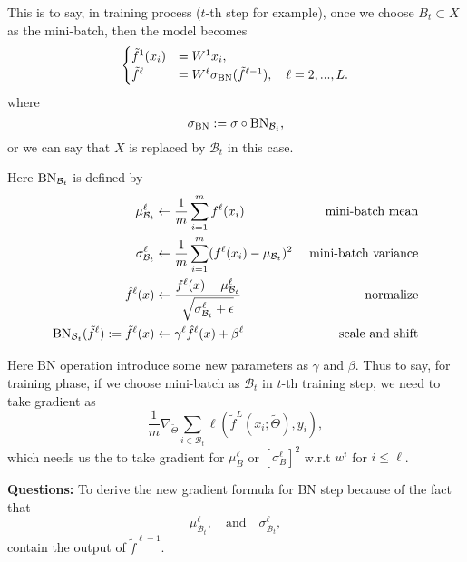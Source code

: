 This is to say, in training process ($t$-th step for example), once we choose $B_t \subset X$
as the mini-batch, then the model becomes
\begin{equation}\label{nn-BN-training}
\begin{cases}
\tilde f^1(x_i)&= W^1 x_i ,\\
\tilde f^\ell &= W^{\ell}  \sigma_{\rm BN}(\tilde f^{\ell-1}), \quad  \ell=2,...,L.
\end{cases}
\end{equation}
where
\begin{equation}
\sigma_{\rm BN} := \sigma \circ {\rm BN}_{\mathcal B_t},
\end{equation}
or we can say that $X$ is replaced by $\mathcal B_t$ in this case.

Here ${\rm BN}_{\mathcal B_t}$ is defined by
\begin{equation}\label{def:BNeq-traning}
\begin{aligned}
\mu^\ell_{\mathcal B_t} & \leftarrow \frac{1}{m}\sum_{i=1}^m f^\ell(x_i) & \text{ mini-batch mean}& \\
\sigma^\ell_{\mathcal B_t} & \leftarrow \frac{1}{m}\sum_{i=1}^m (f^\ell(x_i)-\mu_{\mathcal B_t})^2 &  \text{ mini-batch variance}&\\
\hat f^\ell (x) & \leftarrow \frac{f^\ell(x)-\mu^\ell_{\mathcal B_t}}{\sqrt{\sigma^\ell_{\mathcal B_t}+\epsilon}}   &\text{ normalize}&\\
{\rm BN}_{\mathcal B_t}(\tilde f^{\ell}) := \tilde f^\ell(x) & \leftarrow \gamma^\ell \hat f^\ell (x) + \beta^\ell 
&\text{ scale and shift}&
\end{aligned}
\end{equation}


Here BN operation introduce some new parameters as $\gamma$ and $\beta$. 
Thus to say, for training phase, if we choose mini-batch as $\mathcal B_t$ in $t$-th training
step, we need to take gradient as
\begin{equation}
\frac{1}{m}\nabla_{\tilde \Theta} \sum_{i \in \mathcal B_t} \ell(\tilde f^L(x_i; \tilde \Theta), y_i),
\end{equation}
which needs us the to take gradient for $\mu_{B}^\ell$ or $[\sigma_B^\ell]^2$
w.r.t $w^i$ for $i \le \ell$.


{\bf Questions:} To derive the new gradient formula for BN step because of the fact that 
$$
\mu^\ell_{\mathcal B_t}, \quad \text{and} \quad \sigma^\ell_{\mathcal B_t},
$$
contain the output of $\tilde f^{\ell-1}$. 


